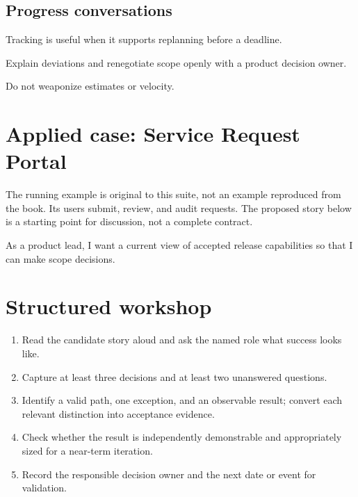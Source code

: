 \documentclass[11pt,letterpaper]{article}
\begin{document}
\subsection{Progress conversations}
Tracking is useful when it supports replanning before a deadline.

\begin{tcolorbox}[colback=tealback,colframe=navy,title={Engineering translation},breakable]
Explain deviations and renegotiate scope openly with a product decision owner.

\end{tcolorbox}
\begin{tcolorbox}[colback=amberback,colframe=navy,title={Failure mode to watch},breakable]
Do not weaponize estimates or velocity.

\end{tcolorbox}
\section{Applied case: Service Request Portal}
The running example is original to this suite, not an example reproduced from the book. Its users submit, review, and audit requests. The proposed story below is a starting point for discussion, not a complete contract.

\begin{tcolorbox}[colback=blueback,colframe=navy,title={Candidate story},breakable]
As a product lead, I want a current view of accepted release capabilities so that I can make scope decisions.

\end{tcolorbox}
\section{Structured workshop}
\begin{enumerate}[leftmargin=*,itemsep=3pt]
\item Read the candidate story aloud and ask the named role what success looks like.
\item Capture at least three decisions and at least two unanswered questions.
\item Identify a valid path, one exception, and an observable result; convert each relevant distinction into acceptance evidence.
\item Check whether the result is independently demonstrable and appropriately sized for a near-term iteration.
\item Record the responsible decision owner and the next date or event for validation.
\end{enumerate}
\end{document}
